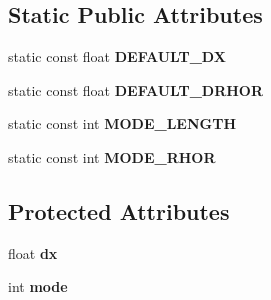 \subsection*{Static Public Attributes}
\begin{DoxyCompactItemize}
\item 
\hypertarget{class_stop_pow_1_1_stop_pow_a64181f1c265a51d1e404045b8e958438}{static const float {\bfseries D\-E\-F\-A\-U\-L\-T\-\_\-\-D\-X}}\label{class_stop_pow_1_1_stop_pow_a64181f1c265a51d1e404045b8e958438}

\item 
\hypertarget{class_stop_pow_1_1_stop_pow_abf5e1ae5fbd8f4e697b7c0480513650d}{static const float {\bfseries D\-E\-F\-A\-U\-L\-T\-\_\-\-D\-R\-H\-O\-R}}\label{class_stop_pow_1_1_stop_pow_abf5e1ae5fbd8f4e697b7c0480513650d}

\item 
\hypertarget{class_stop_pow_1_1_stop_pow_a58f91fb9fd2229ff96ca593bb83e8991}{static const int {\bfseries M\-O\-D\-E\-\_\-\-L\-E\-N\-G\-T\-H}}\label{class_stop_pow_1_1_stop_pow_a58f91fb9fd2229ff96ca593bb83e8991}

\item 
\hypertarget{class_stop_pow_1_1_stop_pow_af32961a5108b85bb4fa0747cbf4e6398}{static const int {\bfseries M\-O\-D\-E\-\_\-\-R\-H\-O\-R}}\label{class_stop_pow_1_1_stop_pow_af32961a5108b85bb4fa0747cbf4e6398}

\end{DoxyCompactItemize}
\subsection*{Protected Attributes}
\begin{DoxyCompactItemize}
\item 
\hypertarget{class_stop_pow_1_1_stop_pow_a6cf58bdac423b48c9d8b4e8f33da65a9}{float {\bfseries dx}}\label{class_stop_pow_1_1_stop_pow_a6cf58bdac423b48c9d8b4e8f33da65a9}

\item 
\hypertarget{class_stop_pow_1_1_stop_pow_a37d8b949dde8d4eb392f11f3a9cf0272}{int {\bfseries mode}}\label{class_stop_pow_1_1_stop_pow_a37d8b949dde8d4eb392f11f3a9cf0272}

\end{DoxyCompactItemize}


